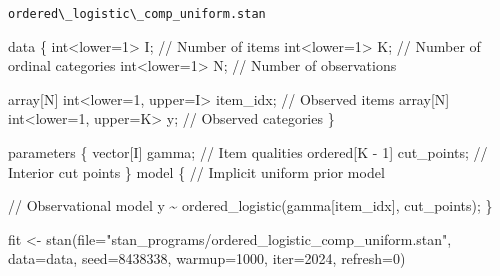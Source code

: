 \documentclass[
  letterpaper,
  DIV=11,
  numbers=noendperiod]{scrartcl}
\newenvironment{Shaded}{\begin{snugshade}}{\end{snugshade}}
\newcommand{\AttributeTok}[1]{\textcolor[rgb]{0.40,0.45,0.13}{#1}}
\newcommand{\CommentTok}[1]{\textcolor[rgb]{0.37,0.37,0.37}{#1}}
\newcommand{\DataTypeTok}[1]{\textcolor[rgb]{0.68,0.00,0.00}{#1}}
\newcommand{\DecValTok}[1]{\textcolor[rgb]{0.68,0.00,0.00}{#1}}
\newcommand{\FunctionTok}[1]{\textcolor[rgb]{0.28,0.35,0.67}{#1}}
\newcommand{\KeywordTok}[1]{\textcolor[rgb]{0.00,0.23,0.31}{#1}}
\newcommand{\NormalTok}[1]{\textcolor[rgb]{0.00,0.23,0.31}{#1}}
\newcommand{\OtherTok}[1]{\textcolor[rgb]{0.00,0.23,0.31}{#1}}
\newcommand{\StringTok}[1]{\textcolor[rgb]{0.13,0.47,0.30}{#1}}
\begin{document}
\begin{codelisting}

\caption{\texttt{ordered\textbackslash\_logistic\textbackslash\_comp\_uniform.stan}}

\begin{Shaded}
\begin{Highlighting}[]
\KeywordTok{data}\NormalTok{ \{}
  \DataTypeTok{int}\NormalTok{\textless{}}\KeywordTok{lower}\NormalTok{=}\DecValTok{1}\NormalTok{\textgreater{} I;                   }\CommentTok{// Number of items}
  \DataTypeTok{int}\NormalTok{\textless{}}\KeywordTok{lower}\NormalTok{=}\DecValTok{1}\NormalTok{\textgreater{} K;                   }\CommentTok{// Number of ordinal categories}
  \DataTypeTok{int}\NormalTok{\textless{}}\KeywordTok{lower}\NormalTok{=}\DecValTok{1}\NormalTok{\textgreater{} N;                   }\CommentTok{// Number of observations}

  \DataTypeTok{array}\NormalTok{[N] }\DataTypeTok{int}\NormalTok{\textless{}}\KeywordTok{lower}\NormalTok{=}\DecValTok{1}\NormalTok{, }\KeywordTok{upper}\NormalTok{=I\textgreater{} item\_idx; }\CommentTok{// Observed items}
  \DataTypeTok{array}\NormalTok{[N] }\DataTypeTok{int}\NormalTok{\textless{}}\KeywordTok{lower}\NormalTok{=}\DecValTok{1}\NormalTok{, }\KeywordTok{upper}\NormalTok{=K\textgreater{} y;        }\CommentTok{// Observed categories}
\NormalTok{\}}

\KeywordTok{parameters}\NormalTok{ \{}
  \DataTypeTok{vector}\NormalTok{[I] gamma;           }\CommentTok{// Item qualities}
  \DataTypeTok{ordered}\NormalTok{[K {-} }\DecValTok{1}\NormalTok{] cut\_points; }\CommentTok{// Interior cut points}
\NormalTok{\}}
\KeywordTok{model}\NormalTok{ \{}
  \CommentTok{// Implicit uniform prior model}
  
  \CommentTok{// Observational model}
\NormalTok{  y \textasciitilde{} ordered\_logistic(gamma[item\_idx], cut\_points);}
\NormalTok{\}}
\end{Highlighting}
\end{Shaded}

\end{codelisting}

\begin{Shaded}
\begin{Highlighting}[]
\NormalTok{fit }\OtherTok{\textless{}{-}} \FunctionTok{stan}\NormalTok{(}\AttributeTok{file=}\StringTok{"stan\_programs/ordered\_logistic\_comp\_uniform.stan"}\NormalTok{,}
            \AttributeTok{data=}\NormalTok{data, }\AttributeTok{seed=}\DecValTok{8438338}\NormalTok{,}
            \AttributeTok{warmup=}\DecValTok{1000}\NormalTok{, }\AttributeTok{iter=}\DecValTok{2024}\NormalTok{, }\AttributeTok{refresh=}\DecValTok{0}\NormalTok{)}
\end{Highlighting}
\end{Shaded}
\end{document}

